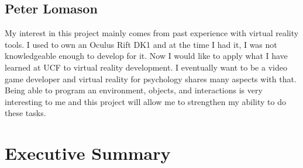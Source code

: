 \documentclass[a4paper,10pt]{article}
\begin{document}
	\subsection{Peter Lomason}
	My interest in this project mainly comes from past experience with virtual reality tools. I used to own an Oculus Rift DK1 and at the time I had it, 
	I was not knowledgeable enough to develop for it. Now I would like to apply what I have learned at UCF to virtual reality development. I eventually want to be
	a video game developer and virtual reality for psychology shares many aspects with that. Being able to program an environment, objects, and interactions is very
	interesting to me and this project will allow me to strengthen my ability to do these tasks.
\pagebreak





\section{Executive Summary}

\pagebreak
\end{document}
